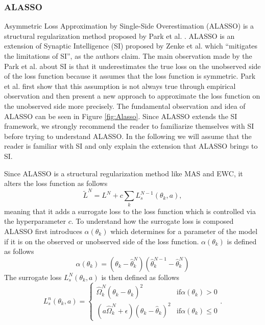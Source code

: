 \subsubsection{ALASSO}
Asymmetric Loss Approximation by Single-Side Overestimation (ALASSO) is a structural regularization method proposed by Park et al. \cite{park2019continual}.
ALASSO is an extension of Synaptic Intelligence (SI) proposed by Zenke et al. \cite{zenke2017continual} which \enquote{mitigates the limitations of SI}, as
the authors claim. The main observation made by the Park et al. about SI is that it underestimates the true loss on the unobserved side of the loss function
because it assumes that the loss function is symmetric. Park et al. first show that this assumption is not always true through empirical observation and then
present a new approach to approximate the loss function on the unobserved side more precisely. The fundamental observation and idea of ALASSO can be seen in
Figure \ref{fig:Alasso}. Since ALASSO extends the SI framework, we strongly recommend the reader to familiarize themselves with SI before trying to understand
ALASSO. In the following we will assume that the reader is familiar with SI and only explain the extension that ALASSO brings to SI. \par
Since ALASSO is a structural regularization method like MAS and EWC, it alters the loss function as follows
\begin{equation}
    \tilde{L}^N = L^N + c \sum_k L_s^{N-1}(\theta_k,a),
\end{equation}
meaning that it adds a surrogate loss to the loss function which is controlled via the hyperparameter $c$. To understand how the surrogate loss is composed
ALASSO first introduces $\alpha(\theta_k)$ which determines for a parameter of the model if it is on the observed or unobserved side of the loss function.
$\alpha(\theta_k)$ is defined as follows
\begin{equation}
    \alpha(\theta_k) = (\theta_k - \hat{\theta}^N_k) (\hat{\theta}^{N-1}_k - \hat{\theta}^N_k)
\end{equation}
The surrogate loss $L^N_s(\theta_k,a)$ is then defined as follows
\begin{equation}
    L_s^n(\theta_k,a) = \begin{cases} \hat{\Omega}^N_k (\theta_k - \hat{\theta}_k)^2 & \text{if} \alpha(\theta_k) > 0 \\
    (a \hat{\Omega}^N_k + \epsilon)(\theta_k - \hat{\theta}_k)^2 & \text{if} \alpha(\theta_k) \leq 0 \end{cases}.
\end{equation}
